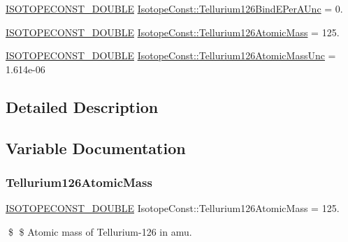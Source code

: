 \begin{DoxyCompactItemize}
\mbox{\hyperlink{group___isotope_const-_macros_ga8f45a7272ce02c0b4c65c44636ed719a}{I\+S\+O\+T\+O\+P\+E\+C\+O\+N\+S\+T\+\_\+\+D\+O\+U\+B\+LE}} \mbox{\hyperlink{group___isotope_const-_tellurium-_te126_ga2b37da3eccd0af9fdeb055d570f894a4}{Isotope\+Const\+::\+Tellurium126\+Bind\+E\+Per\+A\+Unc}} = 0.
\item 
\mbox{\hyperlink{group___isotope_const-_macros_ga8f45a7272ce02c0b4c65c44636ed719a}{I\+S\+O\+T\+O\+P\+E\+C\+O\+N\+S\+T\+\_\+\+D\+O\+U\+B\+LE}} \mbox{\hyperlink{group___isotope_const-_tellurium-_te126_ga10958a3b428380cf4995e1bfe6c99dee}{Isotope\+Const\+::\+Tellurium126\+Atomic\+Mass}} = 125.
\item 
\mbox{\hyperlink{group___isotope_const-_macros_ga8f45a7272ce02c0b4c65c44636ed719a}{I\+S\+O\+T\+O\+P\+E\+C\+O\+N\+S\+T\+\_\+\+D\+O\+U\+B\+LE}} \mbox{\hyperlink{group___isotope_const-_tellurium-_te126_ga2fe799f60fcbf3ec60e7ec29ef2db9e2}{Isotope\+Const\+::\+Tellurium126\+Atomic\+Mass\+Unc}} = 1.\+614e-\/06
\end{DoxyCompactItemize}


\subsection{Detailed Description}


\subsection{Variable Documentation}
\mbox{\label{group___isotope_const-_tellurium-_te126_ga10958a3b428380cf4995e1bfe6c99dee}} 
\subsubsection{\texorpdfstring{Tellurium126\+Atomic\+Mass}{Tellurium126AtomicMass}}
{\footnotesize\ttfamily \mbox{\hyperlink{group___isotope_const-_macros_ga8f45a7272ce02c0b4c65c44636ed719a}{I\+S\+O\+T\+O\+P\+E\+C\+O\+N\+S\+T\+\_\+\+D\+O\+U\+B\+LE}} Isotope\+Const\+::\+Tellurium126\+Atomic\+Mass = 125.}

\$ \$ Atomic mass of Tellurium-\/126 in amu. \mbox{\label{group___isotope_const-_tellurium-_te126_ga2fe799f60fcbf3ec60e7ec29ef2db9e2}} 
